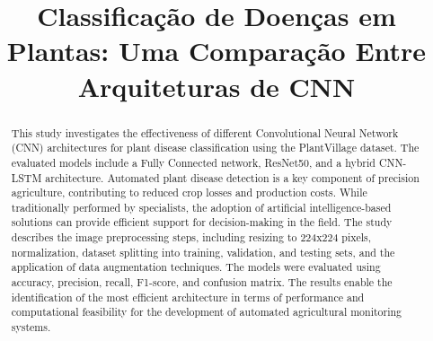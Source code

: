 \documentclass[10pt,conference]{IEEEtran}
\begin{document}
\title{Classificação de Doenças em Plantas: Uma Comparação Entre Arquiteturas de CNN}
\newif\iffinal
\finaltrue
\iffinal
\else
  \author{ID do artigo Latin.science 2020: \cmtid \\ }
\fi
\maketitle
\thispagestyle{fancy}

\begin{abstract}
This study investigates the effectiveness of different Convolutional Neural Network (CNN) architectures for plant disease classification using the PlantVillage dataset. The evaluated models include a Fully Connected network, ResNet50, and a hybrid CNN-LSTM architecture. Automated plant disease detection is a key component of precision agriculture, contributing to reduced crop losses and production costs. While traditionally performed by specialists, the adoption of artificial intelligence-based solutions can provide efficient support for decision-making in the field. The study describes the image preprocessing steps, including resizing to 224x224 pixels, normalization, dataset splitting into training, validation, and testing sets, and the application of data augmentation techniques. The models were evaluated using accuracy, precision, recall, F1-score, and confusion matrix. The results enable the identification of the most efficient architecture in terms of performance and computational feasibility for the development of automated agricultural monitoring systems. 
\end{abstract}
\end{document}
